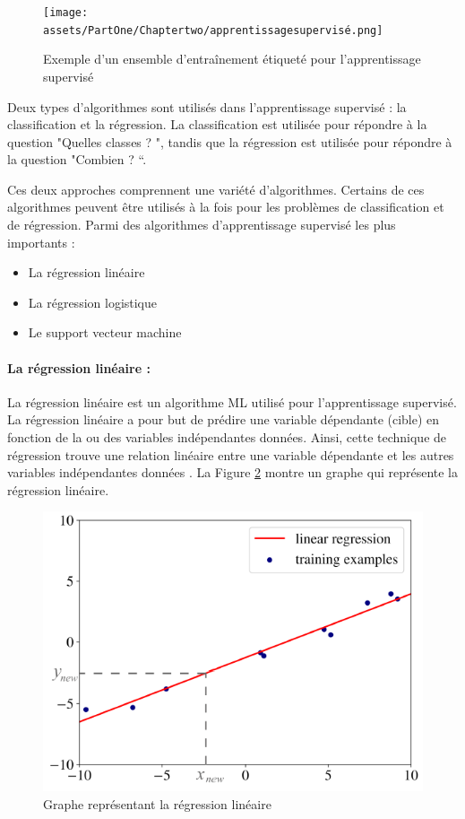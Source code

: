 \begin{figure}[h]
    \centering
    \texttt{[image: assets/PartOne/Chaptertwo/apprentissagesupervisé.png]}
    \caption{Exemple d’un ensemble d'entraînement étiqueté pour l’apprentissage supervisé}
    \label{apprentissagesupervisé}
    \end{figure}

    
\newpage
Deux types d'algorithmes sont utilisés dans l'apprentissage supervisé : la classification et la régression. La classification est utilisée pour répondre à la question "Quelles classes ? ", tandis que la régression est utilisée pour répondre à la question "Combien ? “.

Ces deux approches comprennent une variété d'algorithmes. Certains de ces algorithmes peuvent être utilisés à la fois pour les problèmes de classification et de régression. Parmi des algorithmes d'apprentissage supervisé les plus importants :
\begin{itemize}
    \item La régression linéaire
    \item La régression logistique
    \item Le support vecteur machine
    
\end{itemize}

\paragraph{La régression linéaire :}
 
La régression linéaire est un algorithme ML utilisé pour l'apprentissage supervisé. La régression linéaire a pour but de prédire une variable dépendante (cible) en fonction de la ou des variables indépendantes données. Ainsi, cette technique de régression trouve une relation linéaire entre une variable dépendante et les autres variables indépendantes données \cite{RegressionAlgorithmsRegression2021}. La Figure \ref{régressinlinéaire} montre un graphe qui représente la régression linéaire.

\begin{figure}[h]
    \centering
    \includegraphics[width=12cm]{assets/PartOne/Chaptertwo/régressinlinéaire.png}
    \caption{Graphe représentant la régression linéaire}
    \label{régressinlinéaire}
    \end{figure}

